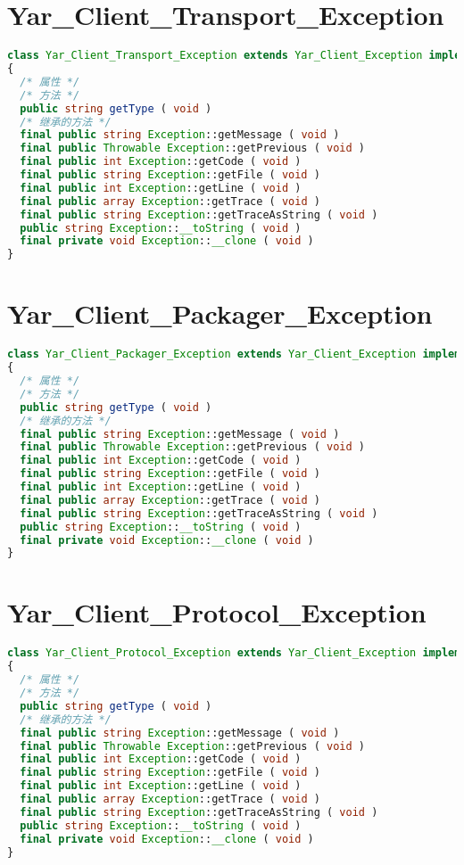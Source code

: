 \chapter{Yar\_Client\_Transport\_Exception}



\begin{lstlisting}[language=PHP]
class Yar_Client_Transport_Exception extends Yar_Client_Exception implements Throwable
{
  /* 属性 */
  /* 方法 */
  public string getType ( void )
  /* 继承的方法 */
  final public string Exception::getMessage ( void )
  final public Throwable Exception::getPrevious ( void )
  final public int Exception::getCode ( void )
  final public string Exception::getFile ( void )
  final public int Exception::getLine ( void )
  final public array Exception::getTrace ( void )
  final public string Exception::getTraceAsString ( void )
  public string Exception::__toString ( void )
  final private void Exception::__clone ( void )
}
\end{lstlisting}






\chapter{Yar\_Client\_Packager\_Exception}



\begin{lstlisting}[language=PHP]
class Yar_Client_Packager_Exception extends Yar_Client_Exception implements Throwable
{
  /* 属性 */
  /* 方法 */
  public string getType ( void )
  /* 继承的方法 */
  final public string Exception::getMessage ( void )
  final public Throwable Exception::getPrevious ( void )
  final public int Exception::getCode ( void )
  final public string Exception::getFile ( void )
  final public int Exception::getLine ( void )
  final public array Exception::getTrace ( void )
  final public string Exception::getTraceAsString ( void )
  public string Exception::__toString ( void )
  final private void Exception::__clone ( void )
}
\end{lstlisting}


\chapter{Yar\_Client\_Protocol\_Exception}

\begin{lstlisting}[language=PHP]
class Yar_Client_Protocol_Exception extends Yar_Client_Exception implements Throwable
{
  /* 属性 */
  /* 方法 */
  public string getType ( void )
  /* 继承的方法 */
  final public string Exception::getMessage ( void )
  final public Throwable Exception::getPrevious ( void )
  final public int Exception::getCode ( void )
  final public string Exception::getFile ( void )
  final public int Exception::getLine ( void )
  final public array Exception::getTrace ( void )
  final public string Exception::getTraceAsString ( void )
  public string Exception::__toString ( void )
  final private void Exception::__clone ( void )
}
\end{lstlisting}


